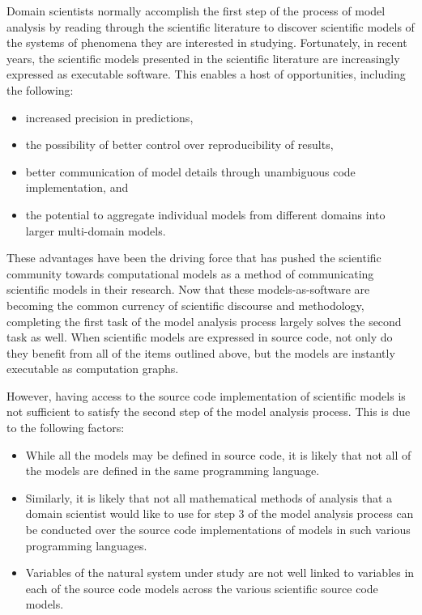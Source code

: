 Domain scientists normally accomplish the first step of the process of model analysis by reading through the scientific literature to discover scientific models of the systems of phenomena they are interested in studying.
Fortunately, in recent years, the scientific models presented in the scientific literature are increasingly expressed as executable software.
This enables a host of opportunities, including the following:
\begin{itemize}
\item increased precision in predictions,
\item the possibility of better control over reproducibility of results,
\item better communication of model details through unambiguous code implementation, and
\item the potential to aggregate individual models from different domains into larger multi-domain models.
\end{itemize}
These advantages have been the driving force that has pushed the scientific community towards computational models as a method of communicating scientific  models in their research.
Now that these models-as-software are becoming the common currency of scientific discourse and methodology, completing the first task of the model analysis process largely solves the second task as well.
When scientific models are expressed in source code, not only do they benefit from all of the items outlined above, but the models are instantly executable as computation graphs.

However, having access to the source code implementation of scientific models is not sufficient to satisfy the second step of the model analysis process.
This is due to the following factors:
\begin{itemize}
  \item While all the models may be defined in source code, it is likely that not all of the models are defined in the same programming language.
  \item Similarly, it is likely that not all mathematical methods of analysis that a domain scientist would like to use for step 3 of the model analysis process can be conducted over the source code implementations of models in such various programming languages.
  \item Variables of the natural system under study are not well linked to variables in each of the source code models across the various scientific source code models.
\end{itemize}

